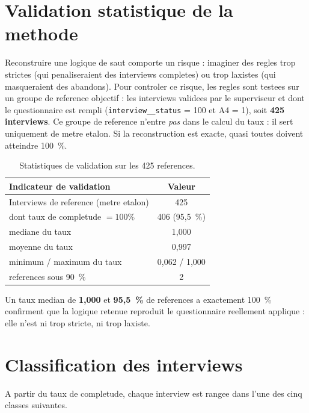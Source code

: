 \documentclass[11pt,a4paper]{article}
\begin{document}
\section{Validation statistique de la methode}

Reconstruire une logique de saut comporte un risque : imaginer des regles
trop strictes (qui penaliseraient des interviews completes) ou trop
laxistes (qui masqueraient des abandons). Pour controler ce risque, les
regles sont testees sur un groupe de reference objectif : les interviews
validees par le superviseur et dont le questionnaire est rempli
(\texttt{interview\_\_status} = 100 et A4 = 1), soit \textbf{425 interviews}.
Ce groupe de reference n'entre \emph{pas} dans le calcul du taux : il sert
uniquement de metre etalon. Si la reconstruction est exacte, quasi toutes
doivent atteindre 100~\%.

\begin{table}[h]
\centering
\caption{Statistiques de validation sur les 425 references.}
\label{tab:validation}
\small
\begin{tabular}{L{8.4cm}c}
\toprule
\textbf{Indicateur de validation} & \textbf{Valeur} \\
\midrule
Interviews de reference (metre etalon)                & 425 \\
dont taux de completude $= 100\%$                     & 406  (95,5~\%) \\
mediane du taux                                       & 1,000 \\
moyenne du taux                                       & 0,997 \\
minimum / maximum du taux                             & 0,062 / 1,000 \\
references sous 90~\%                                 & 2 \\
\bottomrule
\end{tabular}
\end{table}

Un taux median de \textbf{1,000} et \textbf{95,5~\%} de references a
exactement 100~\% confirment que la logique retenue reproduit le
questionnaire reellement applique : elle n'est ni trop stricte, ni trop
laxiste.

\section{Classification des interviews}

A partir du taux de completude, chaque interview est rangee dans l'une des
cinq classes suivantes.
\end{document}
